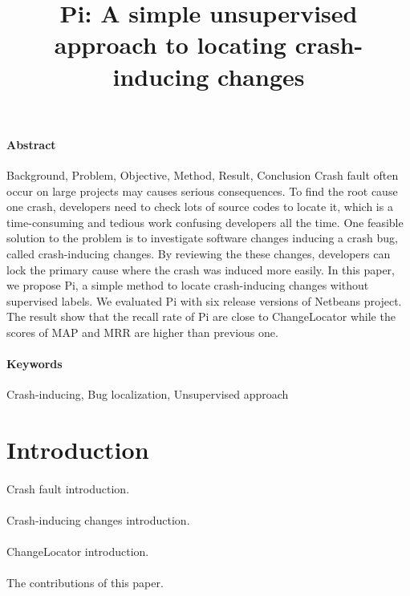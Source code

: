 \documentclass{article}
\begin{document}
\title{Pi: A simple unsupervised approach to locating crash-inducing changes}
\maketitle
\paragraph{Abstract}
Background, Problem, Objective, Method, Result, Conclusion
Crash fault often occur on large projects may causes serious consequences. To find the root cause one crash, developers need to check lots of source codes to locate it, which is a time-consuming and tedious work confusing developers all the time. One feasible solution to the problem is to investigate software changes inducing a crash bug, called crash-inducing changes. By reviewing the these changes, developers can lock the primary cause where the crash was induced more easily.
In this paper, we propose Pi, a simple method to locate crash-inducing changes without supervised labels.
We evaluated Pi with six release versions of Netbeans project. The result show that the recall rate of Pi are close to ChangeLocator while the scores of MAP and MRR are higher than previous one.

\paragraph{Keywords}
Crash-inducing, Bug localization, Unsupervised approach

\section{Introduction}

\paragraph{}
Crash fault introduction.

\paragraph{}
Crash-inducing changes introduction.

\paragraph{}
ChangeLocator introduction.

\paragraph{}
The contributions of this paper.
\end{document}
